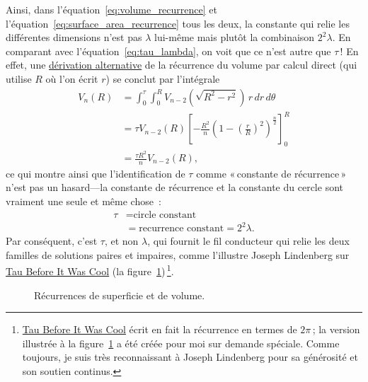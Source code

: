 Ainsi, dans l'équation~\eqref{eq:volume_recurrence} et l'équation~\eqref{eq:surface_area_recurrence} tous les deux, la constante qui relie les différentes dimensions n'est pas $\lambda$ lui-même mais plutôt la combinaison $2^2\lambda$. En comparant avec l'équation~\eqref{eq:tau_lambda}, on voit que ce n'est autre que $\tau$\,! En effet, une \href{https://en.wikipedia.org/wiki/Volume_of_an_n-ball#The_two-dimension_recursion_formula}{dérivation alternative} de la récurrence du volume par calcul direct (qui utilise $R$ où l'on écrit $r$) se conclut par l'intégrale
\begin{equation}
\label{eq:integral_recurrence}
\begin{split}
V_n(R) & = \int_0^\tau \int_0^R V_{n-2}\left(\sqrt{R^2 - r^2}\right) \,r\,dr\,d\theta \\
       & = \tau V_{n-2}(R) \left[-\frac{R^2}{n}\left(1 - \left(\frac{r}{R}\right)^2\right)^\frac{n}{2}\right]_{0}^{R} \\
       & = \frac{\tau R^2}{n} V_{n-2}(R),
\end{split}
\end{equation}
ce qui montre ainsi que l'identification de $\tau$ comme «\,constante de récurrence\,» n'est pas un hasard---la constante de récurrence et la constante du cercle sont vraiment une seule et même chose~:
\[
\begin{split}
\tau & = \mbox{circle constant} \\
     & = \mbox{recurrence constant} = 2^2\lambda.
\end{split}
\]
Par conséquent, c'est $\tau$, et non $\lambda$, qui fournit le fil conducteur qui relie les deux familles de solutions paires et impaires, comme l'illustre Joseph Lindenberg sur \href{https://sites.google.com/site/taubeforeitwascool/}{Tau Before It Was Cool} (la figure~\ref{fig:Nspheres})\,\footnote{\href{https://sites.google.com/site/taubeforeitwascool/}{Tau Before It Was Cool} écrit en fait la récurrence en termes de $2\pi$\,; la version illustrée à la figure~\ref{fig:Nspheres} a été créée pour moi sur demande spéciale. Comme toujours, je suis très reconnaissant à Joseph Lindenberg pour sa générosité et son soutien continus.}.

\begin{figure}
\begin{center}
\end{center}
\caption{Récurrences de superficie et de volume.\label{fig:Nspheres}}
\end{figure}


